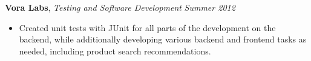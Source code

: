 \documentclass[9pt]{article}
\newenvironment{changemargin}[2]{%
  \begin{list}{}{%
    \setlength{\topsep}{0pt}%
    \setlength{\leftmargin}{#1}%
    \setlength{\rightmargin}{#2}%
    \setlength{\listparindent}{\parindent}%
    \setlength{\itemindent}{\parindent}%
    \setlength{\parsep}{\parskip}%
  }%
  \item[]}{\end{list}
}
\newenvironment{body} {
	\vspace*{-16pt}
	\begin{changemargin}{-0.25in}{-0.5in}
  }	
	{\end{changemargin}
}
\begin{document}
\begin{body}
\begin{itemize}
	\end{itemize}
\smallskip
	\vspace*{1pt}
	\textbf{Vora Labs}, \emph{Testing and Software Development} \hfill \emph{Summer 2012}\\
	\vspace*{-3pt}
	\begin{itemize} \itemsep -0pt  %
		\item Created unit tests with JUnit for all parts of the development on the backend, while additionally developing various backend and frontend tasks as needed, including product search recommendations.
	\end{itemize}
	\vspace*{-3pt}
\smallskip

	
\end{body}

\end{document}
